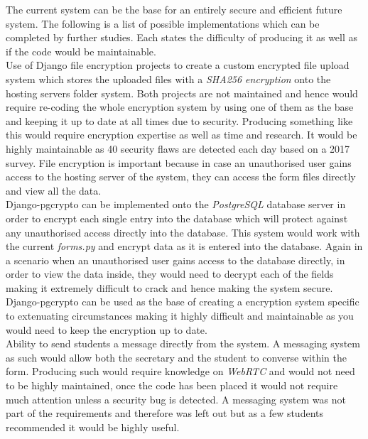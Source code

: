 \documentclass[../main.tex]{subfiles}
\begin{document}
\raggedright
The current system can be the base for an entirely secure and efficient future system. The following is a list of possible implementations which can be completed by further studies. Each states the difficulty of producing it as well as if the code would be maintainable. \\[4mm]

Use of Django file encryption projects\cite{ruddra}\cite{danielquinn} to create a custom encrypted file upload system which stores the uploaded files with a \textit{SHA256 encryption} onto the hosting servers folder system. Both projects are not maintained and hence would require re-coding the whole encryption system by using one of them as the base and keeping it up to date at all times due to security. Producing something like this would require encryption expertise as well as time and research. It would be highly maintainable as 40 security flaws are detected each day based on a 2017 survey\cite{vulner}. File encryption is important because in case an unauthorised user gains access to the hosting server of the system, they can access the form files directly and view all the data. \\[4mm]
  
Django-pgcrypto\cite{dbencrypt} can be implemented onto the \textit{PostgreSQL} database server in order to encrypt each single entry into the database which will protect against any unauthorised access directly into the database. This system would work with the current \textit{forms.py} and encrypt data as it is entered into the database. Again in a scenario when an unauthorised user gains access to the database directly, in order to view the data inside, they would need to decrypt each of the fields making it extremely difficult to crack and hence making the system secure. Django-pgcrypto\cite{dbencrypt} can be used as the base of creating a encryption system specific to extenuating circumstances making it highly difficult and maintainable as you would need to keep the encryption up to date. \\[4mm]
  
Ability to send students a message directly from the system. A messaging system as such would allow both the secretary and the student to converse within the form. Producing such would require knowledge on \textit{WebRTC} and would not need to be highly maintained, once the code has been placed it would not require much attention unless a security bug is detected. A messaging system was not part of the requirements and therefore was left out but as a few students recommended it would be highly useful. \\[4mm]
  
\end{document}
